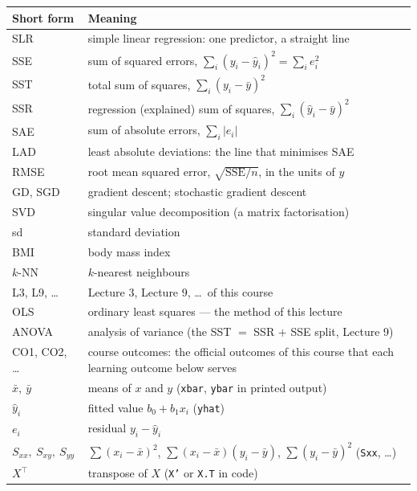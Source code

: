 \documentclass[11pt]{article}
\begin{document}
\begin{center}\small
\begin{tabular}{@{}lp{}@{}}
  \toprule
  \textbf{Short form} & \textbf{Meaning}\\
  \midrule
    SLR & simple linear regression: one predictor, a straight line\\
    SSE & sum of squared errors, $\sum_i (y_i-\hat y_i)^2 = \sum_i e_i^2$\\
    SST & total sum of squares, $\sum_i (y_i-\bar y)^2$\\
    SSR & regression (explained) sum of squares, $\sum_i(\hat y_i-\bar y)^2$\\
    SAE & sum of absolute errors, $\sum_i |e_i|$\\
    LAD & least absolute deviations: the line that minimises SAE\\
    RMSE & root mean squared error, $\sqrt{\mathrm{SSE}/n}$, in the units of $y$\\
    GD, SGD & gradient descent; stochastic gradient descent\\
    SVD & singular value decomposition (a matrix factorisation)\\
    sd & standard deviation\\
    BMI & body mass index\\
    $k$-NN & $k$-nearest neighbours\\
    L3, L9, \dots & Lecture 3, Lecture 9, \dots\ of this course\\
  OLS & ordinary least squares --- the method of this lecture\\
  ANOVA & analysis of variance (the SST $=$ SSR $+$ SSE split, Lecture 9)\\
  CO1, CO2, \dots & course outcomes: the official outcomes of this course that
    each learning outcome below serves\\
  \midrule
    $\bar x,\ \bar y$ & means of $x$ and $y$ (\texttt{xbar}, \texttt{ybar} in printed output)\\
    $\hat y_i$ & fitted value $b_0 + b_1x_i$ (\texttt{yhat})\\
    $e_i$ & residual $y_i - \hat y_i$\\
    $S_{xx},\ S_{xy},\ S_{yy}$ & $\sum(x_i-\bar x)^2$, $\sum(x_i-\bar x)(y_i-\bar y)$, $\sum(y_i-\bar y)^2$ (\texttt{Sxx}, \dots)\\
    $X^{\!\top}$ & transpose of $X$ (\texttt{X'} or \texttt{X.T} in code)\\
  \bottomrule
\end{tabular}
\end{center}
\end{document}
